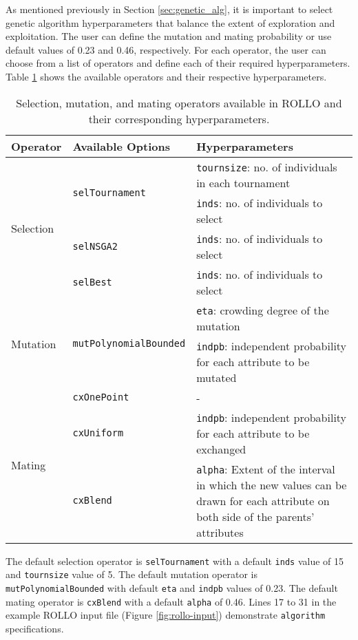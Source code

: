 As mentioned previously in Section \ref{sec:genetic_alg}, it is important to 
select genetic algorithm hyperparameters that balance the extent of exploration 
and exploitation.
The user can define the mutation and mating probability or use default values of 
0.23 and 0.46, respectively. 
For each operator, the user can choose from a list of operators and define each
of their required hyperparameters. 
Table \ref{tab:deap_operators} shows the available operators and their respective 
hyperparameters. 
\begin{table}[]
    \centering
    \onehalfspacing
    \caption{Selection, mutation, and mating operators available in 
    \acrfull{ROLLO} and their corresponding hyperparameters. }
	\label{tab:deap_operators}
    \footnotesize
    \begin{tabular}{l|p{}|p{}}
    \hline
    \textbf{Operator} & \textbf{Available Options} & \textbf{Hyperparameters} \\ \hline
    \multirow{4}{1cm}{Selection} & \multirow{2}{2cm}{\texttt{selTournament}} & \texttt{tournsize}: no. of individuals in each tournament\\ 
    & & \texttt{inds}: no. of individuals to select \\ \cline{2-3}
    & \texttt{selNSGA2} & \texttt{inds}: no. of individuals to select\\ \cline{2-3}
    & \texttt{selBest} & \texttt{inds}: no. of individuals to select\\ \hline
    \multirow{2}{1cm}{Mutation} & \multirow{2}{2cm}{\texttt{mutPolynomialBounded}} & \texttt{eta}: crowding degree of the mutation\\  
    && \texttt{indpb}: independent probability for each attribute to be mutated\\ \hline
    \multirow{3}{1cm}{Mating} & \texttt{cxOnePoint} & -\\ \cline{2-3}
    & \texttt{cxUniform} & \texttt{indpb}: independent probability for each attribute to be exchanged\\ \cline{2-3}
    & \texttt{cxBlend} & \texttt{alpha}: Extent of the interval in which the new values can be drawn for each attribute on both side of the parents’ attributes\\ \hline
    \end{tabular}
    \end{table}
The default selection operator is \texttt{selTournament} with a default
\texttt{inds} value of 15 and \texttt{tournsize} value of 5. 
The default mutation operator is \texttt{mutPolynomialBounded} with default
\texttt{eta} and \texttt{indpb} values of 0.23. 
The default mating operator is \texttt{cxBlend} with a default \texttt{alpha} 
of 0.46. 
Lines 17 to 31 in the example \gls{ROLLO} input file (Figure \ref{fig:rollo-input}) 
demonstrate \texttt{algorithm} specifications. 

